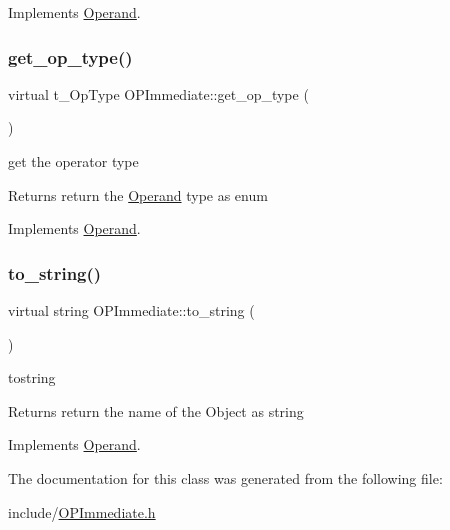 Implements \mbox{\hyperlink{class_operand_a2bf3ad8b34d39cb35ff743ffcc0f4675}{Operand}}.

\mbox{\label{class_o_p_immediate_aed01353798ae57936a9f77dd05eafa88}} 
\subsubsection{\texorpdfstring{get\+\_\+op\+\_\+type()}{get\_op\_type()}}
{\footnotesize\ttfamily virtual t\+\_\+\+Op\+Type O\+P\+Immediate\+::get\+\_\+op\+\_\+type (\begin{DoxyParamCaption}{ }\end{DoxyParamCaption})\hspace{0.3cm}{\ttfamily [virtual]}}



get the operator type 

\begin{DoxyReturn}{Returns}
return the \mbox{\hyperlink{class_operand}{Operand}} type as enum 
\end{DoxyReturn}


Implements \mbox{\hyperlink{class_operand_afd469e305a467e2574f34ac9bd6c62b0}{Operand}}.

\mbox{\label{class_o_p_immediate_a12bc613de3bff73ead8632dafd8050a0}} 
\subsubsection{\texorpdfstring{to\+\_\+string()}{to\_string()}}
{\footnotesize\ttfamily virtual string O\+P\+Immediate\+::to\+\_\+string (\begin{DoxyParamCaption}{ }\end{DoxyParamCaption})\hspace{0.3cm}{\ttfamily [virtual]}}



tostring 

\begin{DoxyReturn}{Returns}
return the name of the Object as string 
\end{DoxyReturn}


Implements \mbox{\hyperlink{class_operand_a28aed96d5fafee66be81c30c1435ad00}{Operand}}.



The documentation for this class was generated from the following file\+:\begin{DoxyCompactItemize}
\item 
include/\mbox{\hyperlink{_o_p_immediate_8h}{O\+P\+Immediate.\+h}}\end{DoxyCompactItemize}
